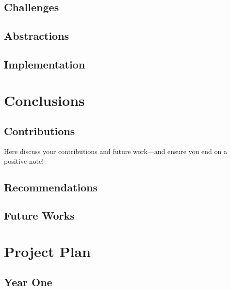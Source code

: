 \documentclass[iwp,first]{luthesis}
\begin{document}
\section{Challenges}


\section{Abstractions}


\section{Implementation}
















\chapter{Conclusions\label{ch:conclusions}}

\section{Contributions}

Here discuss your contributions and future work---and ensure you end on a positive note!

\section{Recommendations}


\section{Future Works}













\chapter{Project Plan}

\section{Year One}
\end{document}
